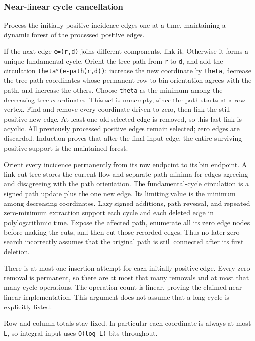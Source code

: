 \hypertarget{af-c467a6f0ad-near-linear-cycle-cancellation}{%
\subsubsection{Near-linear cycle cancellation}\label{af-c467a6f0ad-near-linear-cycle-cancellation}}

Process the initially positive incidence edges one at a time, maintaining a dynamic forest of the processed positive edges.

If the next edge \texttt{e=(r,d)} joins different components, link it. Otherwise it forms a unique fundamental cycle. Orient the tree path from \texttt{r} to \texttt{d}, and add the circulation \texttt{theta*(e-path(r,d))}: increase the new coordinate by \texttt{theta}, decrease the tree-path coordinates whose permanent row-to-bin orientation agrees with the path, and increase the others. Choose \texttt{theta} as the minimum among the decreasing tree coordinates. This set is nonempty, since the path starts at a row vertex. Find and remove every coordinate driven to zero, then link the still-positive new edge. At least one old selected edge is removed, so this last link is acyclic. All previously processed positive edges remain selected; zero edges are discarded. Induction proves that after the final input edge, the entire surviving positive support is the maintained forest.

Orient every incidence permanently from its row endpoint to its bin endpoint. A link-cut tree stores the current flow and separate path minima for edges agreeing and disagreeing with the path orientation. The fundamental-cycle circulation is a signed path update plus the one new edge. Its limiting value is the minimum among decreasing coordinates. Lazy signed additions, path reversal, and repeated zero-minimum extraction support each cycle and each deleted edge in polylogarithmic time. Expose the affected path, enumerate all its zero edge nodes before making the cuts, and then cut those recorded edges. Thus no later zero search incorrectly assumes that the original path is still connected after its first deletion.

There is at most one insertion attempt for each initially positive edge. Every zero removal is permanent, so there are at most that many removals and at most that many cycle operations. The operation count is linear, proving the claimed near-linear implementation. This argument does not assume that a long cycle is explicitly listed.

Row and column totals stay fixed. In particular each coordinate is always at most \texttt{L}, so integral input uses \texttt{O(log\ L)} bits throughout.

